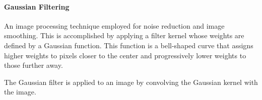 \paragraph{Gaussian Filtering} An image processing technique employed for noise reduction and image smoothing. This is accomplished by applying a filter kernel whose weights are defined by a Gaussian function. This function is a bell-shaped curve that assigns higher weights to pixels closer to the center and progressively lower weights to those further away. 
\begin{comment}{
The Gaussian function used to generate the filter kernel is defined as:

    \begin{equation}
    G(x, y) = \frac{1}{2\pi\sigma^2} \exp\left(-\frac{x^2 + y^2}{2\sigma^2}\right),
\end{equation}}
\end{comment}

The Gaussian filter is applied to an image by convolving the Gaussian kernel with the image. 
\begin{comment}{
Mathematically, this convolution can be expressed as:
\begin{equation}
    I'(u, v) = \sum_{x=-k}^{k} \sum_{y=-k}^{k} G(x, y) \cdot I(u-x, v-y),
\end{equation}
where:
\begin{itemize}
    \item $I(u, v)$ is the original image intensity at pixel $(u, v)$,
    \item $I'(u, v)$ is the filtered image intensity at pixel $(u, v)$,
    \item $k = \lfloor 3\sigma \rfloor$ determines the size of the kernel.
\end{itemize}}
\end{comment}
